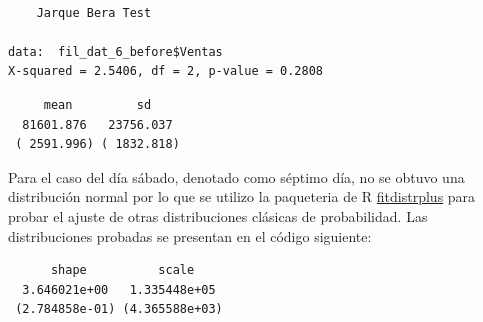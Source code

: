\documentclass[
  us-letterpaper,
]{scrreprt}
\newenvironment{Shaded}{\begin{snugshade}}{\end{snugshade}}
\newcommand{\CommentTok}[1]{\textcolor[rgb]{0.37,0.37,0.37}{#1}}
\newcommand{\FunctionTok}[1]{\textcolor[rgb]{0.28,0.35,0.67}{#1}}
\newcommand{\NormalTok}[1]{\textcolor[rgb]{0.00,0.23,0.31}{#1}}
\newcommand{\SpecialCharTok}[1]{\textcolor[rgb]{0.37,0.37,0.37}{#1}}
\newcommand{\StringTok}[1]{\textcolor[rgb]{0.13,0.47,0.30}{#1}}
\theoremstyle{plain}
\theoremstyle{plain}
\theoremstyle{definition}
\theoremstyle{remark}
\begin{document}
\begin{verbatim}

    Jarque Bera Test

data:  fil_dat_6_before$Ventas
X-squared = 2.5406, df = 2, p-value = 0.2808
\end{verbatim}

\begin{Shaded}
\end{Shaded}

\begin{verbatim}
     mean         sd    
  81601.876   23756.037 
 ( 2591.996) ( 1832.818)
\end{verbatim}

Para el caso del día sábado, denotado como séptimo día, no se obtuvo una
distribución normal por lo que se utilizo la paqueteria de R
\href{https://cran.r-project.org/web/packages/fitdistrplus/index.html}{fitdistrplus}
para probar el ajuste de otras distribuciones clásicas de probabilidad.
Las distribuciones probadas se presentan en el código siguiente:

\begin{Shaded}
\end{Shaded}

\begin{verbatim}
      shape          scale    
  3.646021e+00   1.335448e+05 
 (2.784858e-01) (4.365588e+03)
\end{verbatim}

\begin{Shaded}
\end{Shaded}
\end{document}
